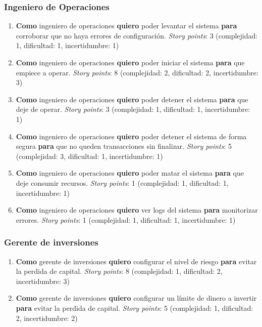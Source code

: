 \documentclass[
    11pt, %
]{charter}
\begin{document}
    \subsubsection{Ingeniero de Operaciones}
    \begin{enumerate}
    \item \textbf{Como} ingeniero de operaciones \textbf{quiero} poder levantar el sistema \textbf{para} corroborar que no haya errores de configuración.
      \textit{Story points}: 3  (complejidad: 1, dificultad: 1, incertidumbre: 1)
    \item \textbf{Como} ingeniero de operaciones \textbf{quiero} poder iniciar el sistema \textbf{para} que empiece a operar.
      \textit{Story points}: 8  (complejidad: 2, dificultad: 2, incertidumbre: 3)
    \item \textbf{Como} ingeniero de operaciones \textbf{quiero} poder detener el sistema \textbf{para} que deje de operar.
      \textit{Story points}: 3  (complejidad: 1, dificultad: 1, incertidumbre: 1)
    \item \textbf{Como} ingeniero de operaciones \textbf{quiero} poder detener el sistema de forma segura \textbf{para} que no queden transacciones sin finalizar.
      \textit{Story points}: 5  (complejidad: 3, dificultad: 1, incertidumbre: 1)
    \item \textbf{Como} ingeniero de operaciones \textbf{quiero} poder matar el sistema \textbf{para} que deje consumir recursos.
      \textit{Story points}: 1  (complejidad: 1, dificultad: 1, incertidumbre: 1)
    \item \textbf{Como} ingeniero de operaciones \textbf{quiero} ver logs del sistema  \textbf{para} monitorizar errores.
      \textit{Story points}: 1  (complejidad: 1, dificultad: 1, incertidumbre: 1)
    \end{enumerate}


    \subsubsection{Gerente de inversiones}
    \begin{enumerate}
    \item \textbf{Como} gerente de inversiones  \textbf{quiero} configurar el nivel de riesgo \textbf{para} evitar la perdida de capital.
      \textit{Story points}: 8  (complejidad: 1, dificultad: 2, incertidumbre: 3)
    \item \textbf{Como} gerente de inversiones \textbf{quiero} configurar un límite de dinero a invertir \textbf{para} evitar la perdida de capital.
      \textit{Story points}: 5  (complejidad: 1, dificultad: 2, incertidumbre: 2)
    \end{enumerate}
\end{document}
